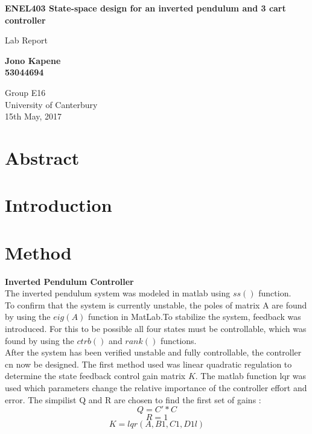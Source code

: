 \documentclass[a4paper,12pt]{article}
\begin{document}
	\begin{titlepage}
    		\begin{center}
        		\vspace*{1cm}
        
        		\textbf{ENEL403  State-space design for an inverted pendulum and 3 cart controller}
        
        		\vspace{0.5cm}
        		Lab Report
        
        		\vspace{1.5cm}
        
        		\textbf{Jono Kapene \\ 53044694}
        
        		\vfill
        		
        		\vspace{0.8cm}
        
        		Group E16\\
        		University of Canterbury\\
        		15th May, 2017
        
    \end{center}
\end{titlepage}
	\clearpage
	\tableofcontents
	\clearpage
	
\section{Abstract}

\section{Introduction}

\section{Method}
\textbf{Inverted Pendulum Controller}\\

The inverted pendulum system was modeled in matlab using $ss()$ function.\\
To confirm that the system is currently unstable, the poles of matrix A are found by using the $eig(A)$ function in MatLab.To stabilize the system, feedback was introduced. For this to be possible all four states must be controllable, which was found by using the $ctrb()$ and $rank()$ functions.\\

After the system has been verified unstable and fully controllable, the controller cn now be designed. The first method used was linear quadratic regulation to determine the state feedback control gain matrix $K$. The matlab function lqr was used which parameters change the relative importance of the controller effort and error. The simpilist Q and R are chosen to find the first set of gains : $$Q = C'*C$$ $$R = 1$$ $$K = lqr(A,B1,C1,D1l)$$
\end{document}
